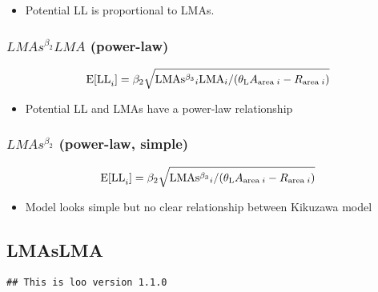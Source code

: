 \documentclass[12pt,]{article}
\providecommand{\tightlist}{%
  \setlength{\itemsep}{0pt}\setlength{\parskip}{0pt}}
\begin{document}
\begin{itemize}
\tightlist
\item
  Potential LL is proportional to LMAs.
\end{itemize}

\subsubsection{\texorpdfstring{\(LMAs^{\beta_2}LMA\)
(power-law)}{LMAs\^{}\{\textbackslash{}beta\_2\}LMA (power-law)}}\label{lmasbeta_2lma-power-law}

\begin{align}
  {\rm E[LL}_{i}] &=\beta_{2} \sqrt{{\rm LMAs^{\beta_3}}_{i}{\rm LMA}_{i}
  / (\theta_{\rm L} A_{{\rm area} \; i} - R_{{\rm area} \; i})} \notag \\
  \label{eq:power}
\end{align}

\begin{itemize}
\tightlist
\item
  Potential LL and LMAs have a power-law relationship
\end{itemize}

\subsubsection{\texorpdfstring{\(LMAs^{\beta_2}\) (power-law,
simple)}{LMAs\^{}\{\textbackslash{}beta\_2\} (power-law, simple)}}\label{lmasbeta_2-power-law-simple}

\begin{align}
  {\rm E[LL}_{i}] &=\beta_{2} \sqrt{{\rm LMAs^{\beta_3}}_{i}
  / (\theta_{\rm L} A_{{\rm area} \; i} - R_{{\rm area} \; i})} \notag \\
  \label{eq:power-simple}
\end{align}

\begin{itemize}
\tightlist
\item
  Model looks simple but no clear relationship between Kikuzawa model
\end{itemize}

\newpage

\subsection{LMAsLMA}\label{lmaslma}

\begin{verbatim}
## This is loo version 1.1.0
\end{verbatim}
\end{document}
